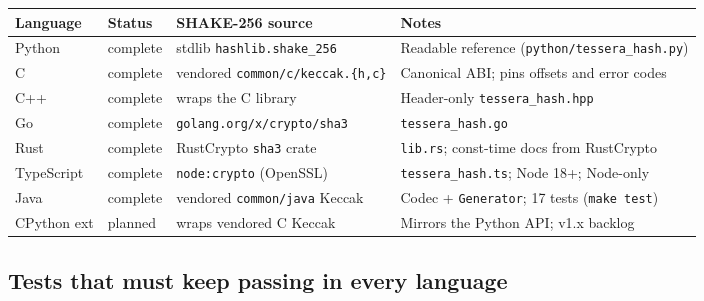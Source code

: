 \begin{center}
\footnotesize
\begin{tabular}{@{}llll@{}}
\toprule
\textbf{Language} & \textbf{Status} & \textbf{SHAKE-256 source}                          & \textbf{Notes} \\
\midrule
Python      & complete & stdlib \texttt{hashlib.shake\_256}            & Readable reference (\texttt{python/tessera\_hash.py}) \\
C           & complete & vendored \texttt{common/c/keccak.\{h,c\}}     & Canonical ABI; pins offsets and error codes \\
C++         & complete & wraps the C library                           & Header-only \texttt{tessera\_hash.hpp} \\
Go          & complete & \texttt{golang.org/x/crypto/sha3}             & \texttt{tessera\_hash.go} \\
Rust        & complete & RustCrypto \texttt{sha3} crate                & \texttt{lib.rs}; const-time docs from RustCrypto \\
TypeScript  & complete & \texttt{node:crypto} (OpenSSL)                & \texttt{tessera\_hash.ts}; Node 18+; Node-only \\
Java        & complete & vendored \texttt{common/java} Keccak          & Codec + \texttt{Generator}; 17 tests (\texttt{make test}) \\
CPython ext & planned  & wraps vendored C Keccak                       & Mirrors the Python API; v1.x backlog \\
\bottomrule
\end{tabular}
\end{center}

\subsection{Tests that must keep passing in every language}
\label{sec:conformance:tests}

